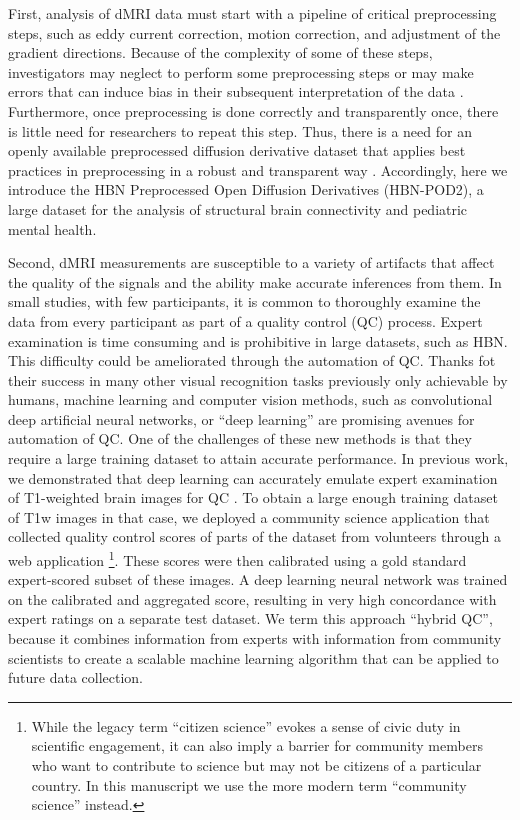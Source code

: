 \documentclass[fleqn,10pt]{wlscirep}
\begin{document}
First, analysis of dMRI data must start with a pipeline of critical
preprocessing steps, such as eddy current correction, motion correction, and
adjustment of the gradient directions. Because of the complexity of some of
these steps, investigators may neglect to perform some preprocessing steps or
may make errors that can induce bias in their subsequent interpretation of the
data \cite{jones2010-ps}. Furthermore, once preprocessing is done correctly and
transparently once, there is little need for researchers to repeat this step.
Thus, there is a need for an openly available preprocessed diffusion derivative
dataset that applies best practices in preprocessing in a robust and transparent
way \cite{cieslak2021-iq}. Accordingly, here we introduce the HBN Preprocessed
Open Diffusion Derivatives (HBN-POD2), a large dataset for the analysis of
structural brain connectivity and pediatric mental health.

Second, dMRI measurements are susceptible to a variety of artifacts that affect
the quality of the signals and the ability make accurate inferences from them.
In small studies, with few participants, it is common to thoroughly examine the
data from every participant as part of a quality control (QC) process. Expert
examination is time consuming and is prohibitive in large datasets, such as HBN.
This difficulty could be ameliorated through the automation of QC. Thanks fot
their success in many other visual recognition tasks previously only achievable
by humans, machine learning and computer vision methods, such as convolutional
deep artificial neural networks, or ``deep learning''  are promising avenues for automation of QC. One
of the challenges of these new methods is that they require a large training
dataset to attain accurate performance. In previous work, we demonstrated that
deep learning can accurately emulate expert examination of T1-weighted brain
images for QC \cite{keshavan2019}. To obtain a large enough training dataset of
T1w images in that case, we deployed a community science application that
collected quality control scores of parts of the dataset from volunteers through
a web application \footnote{%
While the legacy term ``citizen science'' evokes a sense of civic duty in
scientific engagement, it can also imply a barrier for community members who
want to contribute to science but may not be citizens of a particular country.
In this manuscript we use the more modern term ``community science'' instead. }.
These scores were then calibrated using a gold standard expert-scored subset of
these images. A deep learning neural network was trained on the calibrated and
aggregated score, resulting in very high concordance with expert ratings on a
separate test dataset. We term this approach ``hybrid QC'', because it combines
information from experts with information from community scientists to create a
scalable machine learning algorithm that can be applied to future data
collection.
\end{document}

